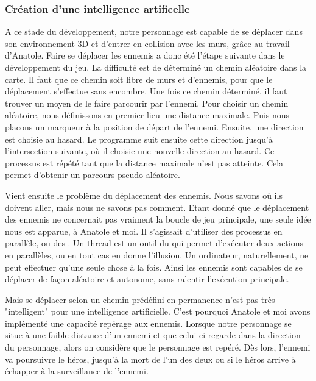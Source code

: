 \documentclass[12pt]{article}
\begin{document}
\newpage

\subsubsection{Création d'une intelligence artificelle}

A ce stade du développement, notre personnage est capable de se déplacer dans son environnement 3D et d'entrer en collision avec les murs, grâce au travail d'Anatole. Faire se déplacer les ennemis a donc été l'étape suivante dans le développement du jeu. La difficulté est de déterminé un chemin aléatoire dans la carte. Il faut que ce chemin soit libre de murs et d'ennemis, pour que le déplacement s'effectue sans encombre. Une fois ce chemin déterminé, il faut trouver un moyen de le faire parcourir par l'ennemi. Pour choisir un chemin aléatoire, nous définissons en premier lieu une distance maximale. Puis nous placons un marqueur à la position de départ de l'ennemi. Ensuite, une direction est choisie au hasard. Le programme suit ensuite cette direction jusqu'à l'intersection suivante, où il choisie une nouvelle direction au hasard. Ce processus est répété tant que la distance maximale n'est pas atteinte. Cela permet d'obtenir un parcours pseudo-aléatoire. 

Vient ensuite le problème du déplacement des ennemis. Nous savons où ils doivent aller, mais nous ne savons pas comment. Etant donné que le déplacement des ennemis ne concernait pas vraiment la boucle de jeu principale, une seule idée nous est apparue, à Anatole et moi. Il s'agissait d'utiliser des processus en parallèle, ou des . Un thread est un outil du  qui permet d'exécuter deux actions en parallèles, ou en tout cas en donne l'illusion. Un ordinateur, naturellement, ne peut effectuer qu'une seule chose à la fois. Ainsi les ennemis sont capables de se déplacer de façon aléatoire et autonome, sans ralentir l'exécution principale. 

Mais se déplacer selon un chemin prédéfini en permanence n'est pas très "intelligent" pour une intelligence artificielle. C'est pourquoi Anatole et moi avons implémenté une capacité repérage aux ennemis.  Lorsque notre personnage se situe à une faible distance d'un ennemi et que celui-ci regarde dans la direction du personnage, alors on considère que le personnage est repéré. Dès lors, l'ennemi va poursuivre le héros, jusqu'à la mort de l'un des deux ou si le héros arrive à échapper à la surveillance de l'ennemi. 
\end{document}
